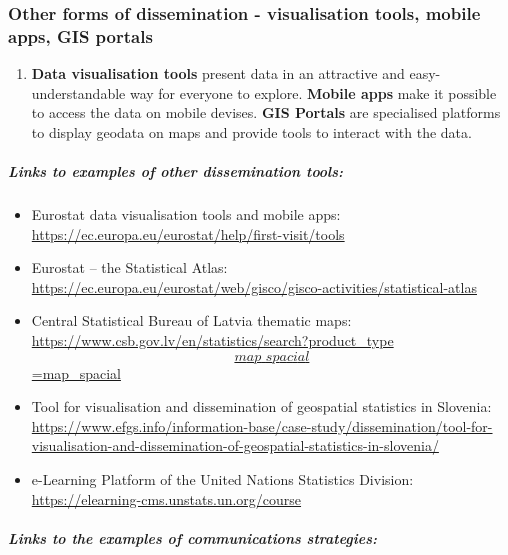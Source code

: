 \documentclass[
]{article}
\providecommand{\tightlist}{%
  \setlength{\itemsep}{0pt}\setlength{\parskip}{0pt}}
\begin{document}
\hypertarget{other-forms-of-dissemination---visualisation-tools-mobile-apps-gis-portals}{%
\subsubsection{Other forms of dissemination - visualisation tools, mobile apps, GIS portals}\label{other-forms-of-dissemination---visualisation-tools-mobile-apps-gis-portals}}

\begin{enumerate}
\def\labelenumi{\arabic{enumi}.}
\setcounter{enumi}{529}
\tightlist
\item
  \textbf{Data visualisation tools} present data in an attractive and
  easy-understandable way for everyone to explore. \textbf{Mobile apps}
  make it possible to access the data on mobile devises. \textbf{GIS
  Portals} are specialised platforms to display geodata on maps and
  provide tools to interact with the data.
\end{enumerate}

\hypertarget{links-to-examples-of-other-dissemination-tools}{%
\subparagraph{Links to examples of other dissemination tools:}\label{links-to-examples-of-other-dissemination-tools}}

\begin{itemize}
\item
  Eurostat data visualisation tools and mobile apps:\\
  \url{https://ec.europa.eu/eurostat/help/first-visit/tools}
\item
  Eurostat -- the Statistical Atlas:
  \url{https://ec.europa.eu/eurostat/web/gisco/gisco-activities/statistical-atlas}
\item
  Central Statistical Bureau of Latvia thematic maps:
  \href{https://www.csb.gov.lv/en/statistics/search?product_type\%5bmap_spacial\%5d=map_spacial}{https://www.csb.gov.lv/en/statistics/search?product\_type\[map\_spacial\]=map\_spacial}
\item
  Tool for visualisation and dissemination of geospatial statistics in
  Slovenia:
  \url{https://www.efgs.info/information-base/case-study/dissemination/tool-for-visualisation-and-dissemination-of-geospatial-statistics-in-slovenia/}
\item
  e-Learning Platform of the United Nations Statistics Division:
  \url{https://elearning-cms.unstats.un.org/course}
\end{itemize}

\hypertarget{links-to-the-examples-of-communications-strategies}{%
\subparagraph{Links to the examples of communications strategies:}\label{links-to-the-examples-of-communications-strategies}}
\end{document}
